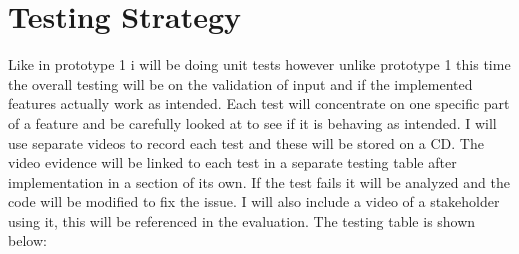 \documentclass[../../../../main.tex]{subfiles}
\begin{document}
\section{Testing Strategy}
Like in prototype 1 i will be doing unit tests however unlike prototype 1 this time the overall testing will be on the validation of input and if the implemented features actually work as intended. Each test will concentrate on one specific part of a feature and be carefully looked at to see if it is behaving as intended. I will use separate videos to record each test and these will be stored on a CD. The video evidence will be linked to each test in a separate testing table after implementation in a section of its own. If the test fails it will be analyzed and the code will be modified to fix the issue. I will also include a video of a stakeholder using it, this will be referenced in the evaluation. The testing table is shown below:
\end{document}
